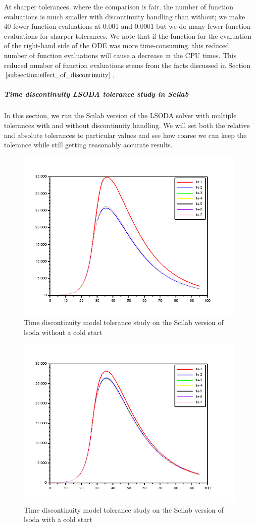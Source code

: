 At sharper tolerances, where the comparison is fair, the number of function evaluations is much smaller with discontinuity handling than without; we make 40 fewer function evaluations at 0.001 and 0.0001 but we do many fewer function evaluations for sharper tolerances. We note that if the function for the evaluation of the right-hand side of the ODE was more time-consuming, this reduced number of function evaluations will cause a decrease in the CPU times. This reduced number of function evaluations stems from the facts discussed in Section $\ref{subsection:effect_of_discontinuity}$. 

\subparagraph{Time discontinuity LSODA tolerance study in Scilab}
In this section, we run the Scilab version of the LSODA solver with multiple tolerances with and without discontinuity handling. We will set both the relative and absolute tolerances to particular values and see how coarse we can keep the tolerance while still getting reasonably accurate results.

\begin{figure}[h]
\centering
\includegraphics[width=0.7\linewidth]{./figures/tolerance_time_lsoda_no_event_sci}
\caption{Time discontinuity model tolerance study on the Scilab version of lsoda without a cold start}
\label{fig:tolerance_time_lsoda_no_event_sci}
\end{figure}

\begin{figure}[h]
\centering
\includegraphics[width=0.7\linewidth]{./figures/tolerance_time_lsoda_with_event_sci}
\caption{Time discontinuity model tolerance study on the Scilab version of lsoda with a cold start}
\label{fig:tolerance_time_lsoda_with_event_sci}
\end{figure}

